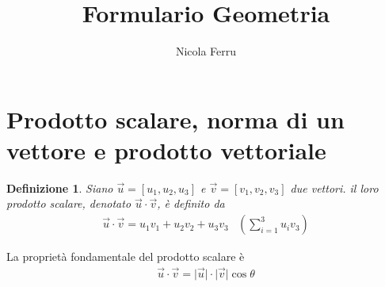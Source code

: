 \documentclass{article}
\title{Formulario Geometria}
\author{Nicola Ferru}
\newcommand{\abs}[1]{\lvert#1\rvert}
\newtheorem{defi}{Definizione}[section]
\newtheorem{esempio}{Esempio}[section]
\begin{document}
\maketitle

\section{Prodotto scalare, norma di un vettore e prodotto vettoriale}
\label{sec:prodScalNormvetteprodvett}
\begin{defi}
  Siano $\vec{u}=[u_1,u_2,u_3]$ e $\vec{v}=[v_1,v_2,v_3]$ due vettori. il loro
  prodotto scalare, denotato $\vec{u}\cdot \vec{v}$, è definito da
  \begin{eqnarray}
    \label{eq:prodottoscalare}
    \vec{u}\cdot \vec{v}=u_1v_1+u_2v_2+u_3v_3 & \left(\sum\limits_{i=1}^3 u_i v_3\right)
  \end{eqnarray}
\end{defi}
La proprietà fondamentale del prodotto scalare è
\begin{eqnarray}
  \label{eq:prodottoscalare1}
  \vec{u}\cdot \vec{v}=\abs{\vec{u}}\cdot\abs{\vec{v}}\cos\theta
\end{eqnarray}
\end{document}
